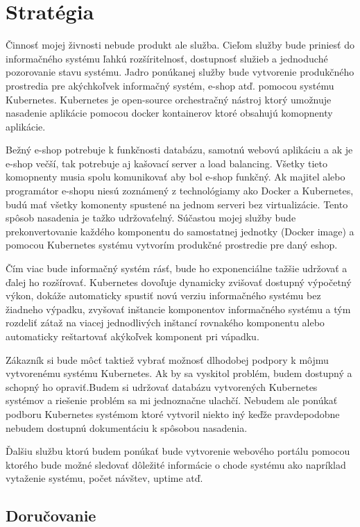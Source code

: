 \chapter{Stratégia}

Činnosť mojej živnosti nebude produkt ale služba. Cieľom služby bude priniesť do informačného systému ľahkú rozšíritelnosť, dostupnosť služieb a jednoduché pozorovanie stavu systému. Jadro ponúkanej služby bude vytvorenie produkčného prostredia pre akýchkoľvek informačný systém, e-shop atď. pomocou systému Kubernetes. Kubernetes je open-source orchestračný nástroj ktorý umožnuje nasadenie aplikácie pomocou docker kontainerov ktoré obsahujú komopnenty aplikácie. 

Bežný e-shop potrebuje k funkčnosti databázu, samotnú webovú aplikáciu a ak je e-shop večší, tak potrebuje aj kašovací server a load balancing. Všetky tieto komopnenty musia spolu komunikovať aby bol e-shop funkčný. Ak majitel alebo programátor e-shopu niesú zoznámený z technológiamy ako Docker a Kubernetes, budú mať všetky komonenty spustené na jednom serveri bez virtualizácie. Tento spôsob nasadenia je tažko udržovaťelný. Súčastou mojej služby bude prekonvertovanie každého komponentu do samostatnej jednotky (Docker image) a pomocou Kubernetes systému vytvorím produkčné prostredie pre daný eshop.

Čím viac bude informačný systém rásť, bude ho exponenciálne tažšie udržovať a ďalej ho rozšírovať. Kubernetes dovoľuje dynamicky zvišovať dostupný výpočetný výkon, dokáže automaticky spustiť novú verziu informačného systému bez žiadneho výpadku, zvyšovať inštancie komponentov informačného systému a tým rozdeliť zátaž na viacej jednodlivých inštancí rovnakého komponentu alebo automaticky reštartovať akýkoľvek komponent pri vápadku. 

Zákazník si bude môcť taktiež vybrať možnosť dlhodobej podpory k môjmu vytvorenému systému Kubernetes. Ak by sa vyskitol problém, budem dostupný a schopný ho opraviť.Budem si udržovať databázu vytvorených Kubernetes systémov a riešenie problém sa mi jednoznačne ulachčí. Nebudem ale ponúkať podboru Kubernetes systémom ktoré vytvoril niekto iný keďže pravdepodobne nebudem dostupnú dokumentáciu k spôsobou nasadenia.

Ďalšiu službu ktorú budem ponúkať bude vytvorenie webového portálu pomocou ktorého bude možné sledovať dôležité informácie o chode systému ako napríklad vytaženie systému, počet návštev, uptime atď.


\section{Doručovanie}

